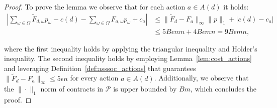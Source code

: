 \closeutility*
\begin{proof}
To prove the lemma we observe that for each action $a \in A(d)$ it holds:
\begin{align*}
	\left|\sum_{\omega \in \Omega} \widetilde{F}_{d,\omega} p_\omega -c(d) - \sum_{\omega \in \Omega} F_{a, \omega} p_\omega + c_{a} \right| & \le \| \widetilde{F}_{d } - {F}_{a} \|_{\infty} \| p \|_{1}   +  |c(d)-c_a|\\
	& \le 5 B \epsilon m  n  +  4 B \epsilon m  n = 9B \epsilon m  n,
\end{align*}

where the first inequality holds by applying the triangular inequality and Holder's inequality. The second inequality holds by employing Lemma~\ref{lem:cost_actions} and leveraging Definition~\ref{def:asssoc_actions} that guarantees $\| \widetilde{F}_{d} - {F}_{a} \|_{\infty} \le 5 \epsilon n$ for every action $a \in A(d)$. Additionally, we observe that the $\|\cdot\|_1$ norm of contracts in $\mathcal{P}$ is upper bounded by $Bm$, which concludes the proof.
\end{proof}


